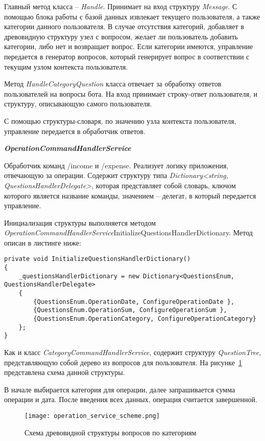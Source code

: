 Главный метод класса – \emph{Handle}. Принимает на вход структуру \emph{Message}. С помощью блока работы с базой данных извлекает текущего пользователя, а также категории данного пользователя. В случае отсутствия категорий, добавляет в древовидную структуру узел с вопросом, желает ли пользователь добавить категории, либо нет и возвращает вопрос. Если категории имеются, управление передается в генератор вопросов, который генерирует вопрос в соответствии с текущим узлом контекста пользователя.

Метод \emph{HandleCategoryQuestion} класса отвечает за обработку ответов
пользователей на вопросы бота. На вход принимает строку-ответ
пользователя, и структуру, описывающую самого пользователя.

С помощью структуры-словаря, по значению узла контекста
пользователя, управление передается в обработчик ответов.

\textbf{\emph{OperationCommandHandlerService}}

Обработчик команд /income и /expense. Реализует логику приложения,
отвечающую за операции. Содержит структуру типа \emph{Dictionary<string,
QuestionsHandlerDelegate>}, которая представляет собой словарь, ключом
которого является название команды, значением – делегат, в который
передается управление.

Инициализация структуры выполняется методом
\emph{OperationCommandHandlerService}InitializeQuestionsHandlerDictionary. Метод описан в листинге ниже:

\lstset{style=sharpc}
\begin{lstlisting}
private void InitializeQuestionsHandlerDictionary()
{
	_questionsHandlerDictionary = new Dictionary<QuestionsEnum, QuestionsHandlerDelegate>
	{
		{QuestionsEnum.OperationDate, ConfigureOperationDate },
		{QuestionsEnum.OperationSum, ConfigureOperationSum },
		{QuestionsEnum.OperationCategory, ConfigureOperationCategory}
	};
}
\end{lstlisting}

Как и класс \emph{CategoryCommandHandlerService}, содержит структуру
\emph{QuestionTree}, представляющую собой дерево из вопросов для пользователя. На рисунке~\ref{fig:design:server:operation_service_scheme} представлена схема данной структуры.

В начале выбирается категория для операции, далее запрашивается
сумма операции и дата. После введения всех данных, операция считается завершенной.

\begin{figure}[!h]
\centering
	\texttt{[image: operation\_service\_scheme.png]}
	\caption{Схема древовидной структуры вопросов по категориям}
	\label{fig:design:server:operation_service_scheme}
\end{figure}

